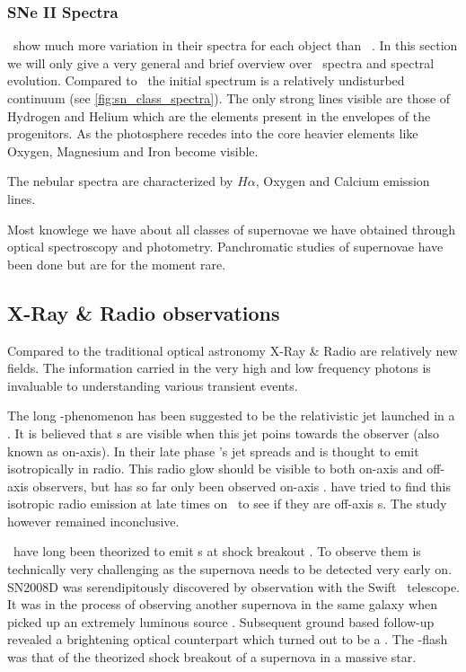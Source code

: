 \subsubsection{SNe II Spectra}
\sneii\ show much more variation in their spectra for each object than \sneia\ . In this section we will only give a very general and brief overview over \sneii\ spectra and spectral evolution. 
Compared to \sneia\ the initial spectrum is a relatively undisturbed continuum (see \ref{fig:sn_class_spectra}). The only strong lines visible are those of Hydrogen and Helium which are the elements present in the envelopes of the progenitors. 
As the photosphere recedes into the core heavier elements like Oxygen, Magnesium and Iron become visible. 

The nebular spectra are characterized by $H\alpha$, Oxygen and Calcium emission lines. 

Most knowlege we have about all classes of supernovae we have obtained through optical spectroscopy and photometry. Panchromatic studies of supernovae have been done but are for the moment rare.

\subsection{X-Ray \& Radio observations}

Compared to the traditional optical astronomy X-Ray \& Radio are relatively new fields. The information carried in the very high and low frequency photons is invaluable to understanding various transient events. 

The long \grb-phenomenon has been suggested to be the relativistic jet launched in a \snibc. It is believed that \grb s are visible when this jet poins towards the observer (also known as on-axis). In their late phase \grb 's jet spreads and is thought to emit isotropically in radio. This radio glow should be visible to both on-axis and off-axis observers, but has so far only been observed on-axis . \cite{2006ApJ...638..930S} have tried to find this isotropic radio emission at late times on \snibc\ to see if they are off-axis \grb s. The study however remained inconclusive.

\sneii\ have long been theorized to emit \xray s at shock breakout \citep{1978ApJ...223L.109K,1974ApJ...187..333C}. To observe them is technically very challenging as the supernova needs to be detected very early on. SN2008D was serendipitously discovered by observation with the Swift \xray\ telescope. It was in the process of observing another supernova  in the same galaxy when  picked up an extremely luminous source \cite{2008Natur.453..469S}. Subsequent ground based follow-up revealed a brightening optical counterpart which turned out to be a \snibc. The \xray-flash was that of the theorized shock breakout of a supernova in a massive star.

